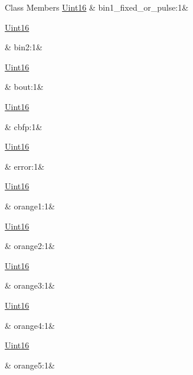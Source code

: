 \begin{DoxyFields}{Class Members}
\hypertarget{a00001_a5f1278cb14ef10ab54cef60b74b9a3fe}{\hyperlink{a00001_aae7407b021d43f7193a81a58cfb3e297}{Uint16}}\label{a00001_a5f1278cb14ef10ab54cef60b74b9a3fe}
&
bin1\+\_\+fixed\+\_\+or\+\_\+pulse\+:1&
\\
\hline

\hypertarget{a00001_afe18431d7c0a68328e87a0281bbb4d75}{\hyperlink{a00001_aae7407b021d43f7193a81a58cfb3e297}{Uint16}}\label{a00001_afe18431d7c0a68328e87a0281bbb4d75}
&
bin2\+:1&
\\
\hline

\hypertarget{a00001_aeed1627ebd47bbc2ae83eeb8bc13093a}{\hyperlink{a00001_aae7407b021d43f7193a81a58cfb3e297}{Uint16}}\label{a00001_aeed1627ebd47bbc2ae83eeb8bc13093a}
&
bout\+:1&
\\
\hline

\hypertarget{a00001_a9be137c9f520a458797470096a207991}{\hyperlink{a00001_aae7407b021d43f7193a81a58cfb3e297}{Uint16}}\label{a00001_a9be137c9f520a458797470096a207991}
&
cbfp\+:1&
\\
\hline

\hypertarget{a00001_acb5e100e5a9a3e7f6d1fd97512215282}{\hyperlink{a00001_aae7407b021d43f7193a81a58cfb3e297}{Uint16}}\label{a00001_acb5e100e5a9a3e7f6d1fd97512215282}
&
error\+:1&
\\
\hline

\hypertarget{a00001_ab3e24b7672fddf21613da79b21ff7c99}{\hyperlink{a00001_aae7407b021d43f7193a81a58cfb3e297}{Uint16}}\label{a00001_ab3e24b7672fddf21613da79b21ff7c99}
&
orange1\+:1&
\\
\hline

\hypertarget{a00001_aca3a7d2769619fed99faee8977b02fc2}{\hyperlink{a00001_aae7407b021d43f7193a81a58cfb3e297}{Uint16}}\label{a00001_aca3a7d2769619fed99faee8977b02fc2}
&
orange2\+:1&
\\
\hline

\hypertarget{a00001_a2cb96362dc7bcfbec73d26122e1ee037}{\hyperlink{a00001_aae7407b021d43f7193a81a58cfb3e297}{Uint16}}\label{a00001_a2cb96362dc7bcfbec73d26122e1ee037}
&
orange3\+:1&
\\
\hline

\hypertarget{a00001_a090b43703fdb446409e46689d6cff387}{\hyperlink{a00001_aae7407b021d43f7193a81a58cfb3e297}{Uint16}}\label{a00001_a090b43703fdb446409e46689d6cff387}
&
orange4\+:1&
\\
\hline

\hypertarget{a00001_afb8bed3af3b1c74a788ed20a80164cc1}{\hyperlink{a00001_aae7407b021d43f7193a81a58cfb3e297}{Uint16}}\label{a00001_afb8bed3af3b1c74a788ed20a80164cc1}
&
orange5\+:1&
\\
\hline


\end{DoxyFields}
